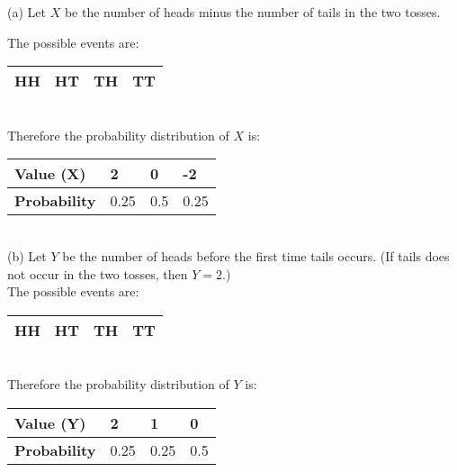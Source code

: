 \documentclass[boxes, qed]{homework}
\begin{document}
\begin{solution}
  (a) Let $X$ be the number of heads minus the number of tails in the two tosses. 
  
  The possible events are:
  \begin{tabular}{|l|l|l|l|}
    \hline
    HH & HT & TH & TT \\
    \hline
  \end{tabular}\\
  
  Therefore the probability distribution of $X$ is:\\

  \begin{tabular}{|l|l|l|l|}
    \hline
    \textbf{Value (X)} & 2 & 0 & -2 \\
    \hline
    \textbf{Probability} & 0.25 & 0.5 & 0.25 \\
    \hline
  \end{tabular}\\

  (b)  Let $Y$ be the number of heads before the 
  first time tails occurs. (If tails does not occur in the
  two tosses, then $Y = 2$.)\\

  The possible events are:  
  \begin{tabular}{|l|l|l|l|}
    \hline
    HH & HT & TH & TT \\
    \hline
  \end{tabular}\\  

  Therefore the probability distribution of $Y$ is:\\

  \begin{tabular}{|l|l|l|l|}
    \hline
    \textbf{Value (Y)} & 2 & 1 & 0 \\
    \hline
    \textbf{Probability} & 0.25 & 0.25 & 0.5 \\
    \hline
  \end{tabular}
\end{solution}
\end{document}
